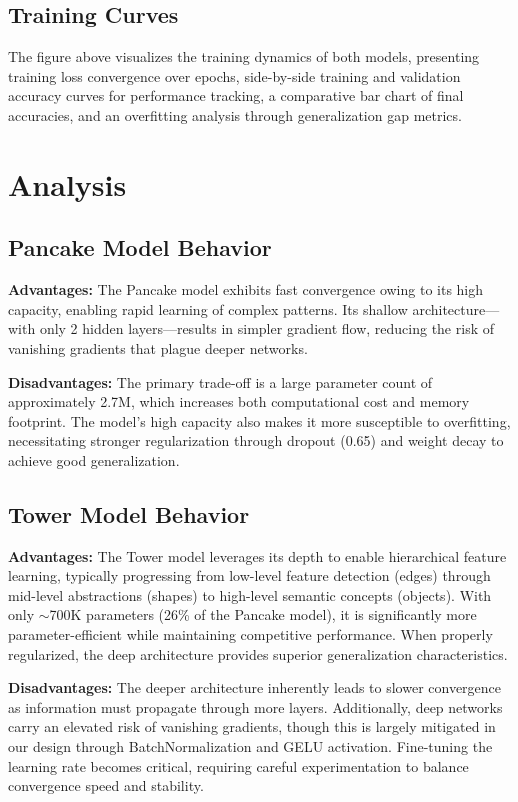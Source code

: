 \documentclass[11pt]{article}
\begin{document}
\subsection{Training Curves}


The figure above visualizes the training dynamics of both models, presenting training loss convergence over epochs, side-by-side training and validation accuracy curves for performance tracking, a comparative bar chart of final accuracies, and an overfitting analysis through generalization gap metrics.

\section{Analysis}

\subsection{Pancake Model Behavior}

\textbf{Advantages:} The Pancake model exhibits fast convergence owing to its high capacity, enabling rapid learning of complex patterns. Its shallow architecture—with only 2 hidden layers—results in simpler gradient flow, reducing the risk of vanishing gradients that plague deeper networks.

\textbf{Disadvantages:} The primary trade-off is a large parameter count of approximately 2.7M, which increases both computational cost and memory footprint. The model's high capacity also makes it more susceptible to overfitting, necessitating stronger regularization through dropout (0.65) and weight decay to achieve good generalization.

\subsection{Tower Model Behavior}

\textbf{Advantages:} The Tower model leverages its depth to enable hierarchical feature learning, typically progressing from low-level feature detection (edges) through mid-level abstractions (shapes) to high-level semantic concepts (objects). With only $\sim$700K parameters (26\% of the Pancake model), it is significantly more parameter-efficient while maintaining competitive performance. When properly regularized, the deep architecture provides superior generalization characteristics.

\textbf{Disadvantages:} The deeper architecture inherently leads to slower convergence as information must propagate through more layers. Additionally, deep networks carry an elevated risk of vanishing gradients, though this is largely mitigated in our design through BatchNormalization and GELU activation. Fine-tuning the learning rate becomes critical, requiring careful experimentation to balance convergence speed and stability.
\end{document}
